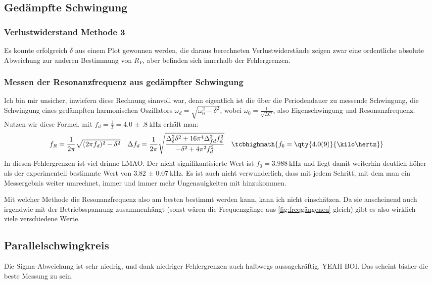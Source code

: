 \subsection{Gedämpfte Schwingung}
\subsubsection{Verlustwiderstand Methode 3}
Es konnte erfolgreich \(\delta\) aus einem Plot gewonnen werden, die daraus berechneten Verlustwiderstände zeigen zwar eine ordentliche absolute Abweichung zur anderen Bestimmung von \(R_V\), aber befinden sich innerhalb der Fehlergrenzen.

\subsubsection{Messen der Resonanzfrequenz aus gedämpfter Schwingung}
Ich bin mir unsicher, inwiefern diese Rechnung sinnvoll war, denn eigentlich ist die über die Periodendauer zu messende Schwingung, die Schwingung eines gedämpften harmonischen Oszillators \(\omega_d=\sqrt{\omega_0^2-\delta^2}\), wobei \(\omega_0=\frac{1}{\sqrt{LC}}\), also Eigenschwingung und Resonanzfrequenz. Nutzen wir diese Formel, mit \(f_d=\frac{1}{T}=\qty{4.0(8)}{\kilo\hertz}\) erhält man:
\begin{align}
    f_R=\frac{1}{2\pi}\sqrt{(2\pi f_d)^2-\delta^2}&&\Delta f_d=\frac{1}{2\pi}\sqrt{\frac{\Delta_{\delta}^{2} \delta^{2} + 16 \pi^{4} \Delta_{f d}^{2} f_{d}^{2}}{- \delta^{2} + 4 \pi^{2} f_{d}^{2}}}&&\tcbhighmath{f_0=\qty{4.0(9)}{\kilo\hertz}}
\end{align}
In diesen Fehlergrenzen ist viel drinne LMAO. Der nicht signifikantisierte Wert ist \(f_0=\qty{3.988}{\kilo\hertz}\) und liegt damit weiterhin deutlich höher als der experimentell bestimmte Wert von \(\qty{3.82(7)}{\kilo\hertz}\). Es ist auch nicht verwunderlich, dass mit jedem Schritt, mit dem man ein Messergebnis weiter umrechnet, immer und immer mehr Ungenauigkeiten mit hinzukommen. 

Mit welcher Methode die Resonanzfrequenz also am besten bestimmt werden kann, kann ich nicht einschätzen. Da sie anscheinend auch irgendwie mit der Betriebsspannung zusammenhängt (sonst wären die Frequenzgänge aus \cref{fig:freqgängeneu} gleich) gibt es also wirklich viele verschiedene Werte. 

\subsection{Parallelschwingkreis}
Die Sigma-Abweichung ist sehr niedrig, und dank niedriger Fehlergrenzen auch halbwegs aussagekräftig. YEAH BOI. Das scheint bisher die beste Messung zu sein. 

